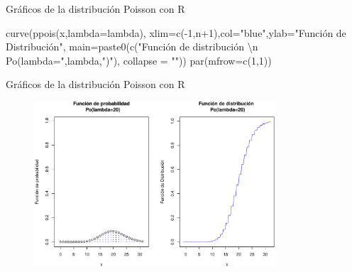 \documentclass[
  ignorenonframetext,
  aspectratio=169]{beamer}
\newenvironment{Shaded}{\begin{snugshade}}{\end{snugshade}}
\newcommand{\AttributeTok}[1]{\textcolor[rgb]{0.40,0.45,0.13}{#1}}
\newcommand{\DecValTok}[1]{\textcolor[rgb]{0.68,0.00,0.00}{#1}}
\newcommand{\FunctionTok}[1]{\textcolor[rgb]{0.28,0.35,0.67}{#1}}
\newcommand{\NormalTok}[1]{\textcolor[rgb]{0.00,0.23,0.31}{#1}}
\newcommand{\SpecialCharTok}[1]{\textcolor[rgb]{0.37,0.37,0.37}{#1}}
\newcommand{\StringTok}[1]{\textcolor[rgb]{0.13,0.47,0.30}{#1}}
\begin{document}
\begin{frame}[fragile]{Gráficos de la distribución Poisson con R}
\begin{Shaded}
\begin{Highlighting}[]
\FunctionTok{curve}\NormalTok{(}\FunctionTok{ppois}\NormalTok{(x,}\AttributeTok{lambda=}\NormalTok{lambda),}
      \AttributeTok{xlim=}\FunctionTok{c}\NormalTok{(}\SpecialCharTok{{-}}\DecValTok{1}\NormalTok{,n}\SpecialCharTok{+}\DecValTok{1}\NormalTok{),}\AttributeTok{col=}\StringTok{"blue"}\NormalTok{,}\AttributeTok{ylab=}\StringTok{"Función de Distribución"}\NormalTok{,}
      \AttributeTok{main=}\FunctionTok{paste0}\NormalTok{(}\FunctionTok{c}\NormalTok{(}\StringTok{"Función de distribución }\SpecialCharTok{\textbackslash{}n}\StringTok{ Po(lambda="}\NormalTok{,lambda,}\StringTok{")"}\NormalTok{),}
                  \AttributeTok{collapse =} \StringTok{""}\NormalTok{))}
\FunctionTok{par}\NormalTok{(}\AttributeTok{mfrow=}\FunctionTok{c}\NormalTok{(}\DecValTok{1}\NormalTok{,}\DecValTok{1}\NormalTok{))}
\end{Highlighting}
\end{Shaded}
\end{frame}

\begin{frame}{Gráficos de la distribución Poisson con R}
\protect\hypertarget{gruxe1ficos-de-la-distribuciuxf3n-poisson-con-r-1}{}
\begin{figure}

{\centering \includegraphics[width=0.8\textwidth,height=\textheight]{Tema_3_1_Notables_files/figure-beamer/graficosPOISON-1.pdf}

}

\end{figure}
\end{frame}
\end{document}
